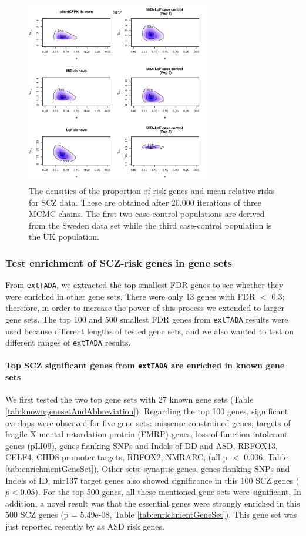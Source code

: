 \documentclass[]{article}
\begin{document}
\begin{figure}[H]
\includegraphics[width=\textwidth,height=8cm]{Picture/HeatMapPostDensitySCZ_combinedCC.pdf}
\caption{The densities of the proportion of risk genes
  and mean relative risks for SCZ data. These are obtained after
  20,000 iterations of three MCMC chains. The first two case-control populations are
  derived from the Sweden data set while the third case-control
  population is the UK population.}
\label{fig:heatmapSCZ}
\end{figure}

\subsubsection{Test enrichment of SCZ-risk genes in gene sets}

From \texttt{extTADA}, we extracted the top smallest FDR genes to see
whether they were enriched in other gene sets. There were only 13
genes with FDR $<$ 0.3; therefore, in order to increase the power
of this process we extended to larger gene sets.
The top 100 and 500 smallest FDR genes from \texttt{extTADA} results were used because different
lengths of tested gene sets, and we also wanted to test on different
ranges of \texttt{extTADA} results.

\paragraph{Top SCZ significant genes from \texttt{extTADA} are enriched
  in known gene sets}

We first tested the two top gene sets with 27 known gene sets
(Table \ref{tab:knowngenesetAndAbbreviation}).
Regarding the top 100 genes, significant overlaps
were observed for five gene sets: missense constrained genes, targets
of fragile X mental retardation protein (FMRP)
genes, loss-of-function intolerant genes (pLI09), genes flanking SNPs
and Indels of DD and ASD, RBFOX13, CELF4, CHD8 promoter targets,
RBFOX2, NMRARC, (all p $<$ 0.006, Table
\ref{tab:enrichmentGeneSet}). Other sets: synaptic genes, genes
flanking SNPs and Indels of ID, mir137 target genes also showed
significance in this 100 SCZ genes ($p < 0.05$). For the top 500
genes, all these mentioned gene sets were significant. In addition, a novel result was that the essential genes
were strongly enriched in this 500 SCZ genes (p =  5.49e-08, Table
\ref{tab:enrichmentGeneSet}). This gene set was just reported recently by \cite{ji2016increased} as ASD risk genes.
\end{document}
